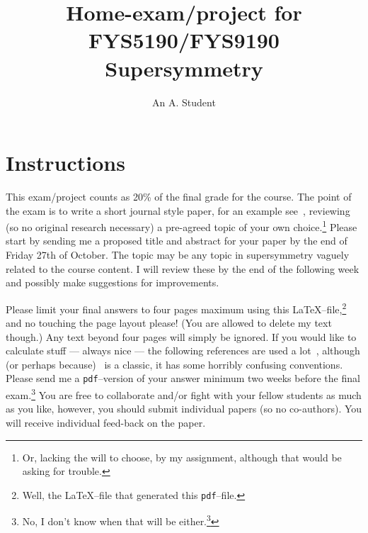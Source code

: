 \documentclass[twocolumn,a4paper,10pt]{article}
\author{An A. Student}
\title{Home-exam/project for FYS5190/FYS9190 Supersymmetry}
\begin{document}

\section{Instructions}
This exam/project counts as 20\% of the final grade for the course. The point of the exam is to write a short journal style paper, for an example see~\cite{Barr:2013sla}, reviewing (so no original research necessary) a pre-agreed topic of your own choice.\footnote{Or, lacking the will to choose, by my assignment, although that would be asking for trouble.} Please start by sending me a proposed title and abstract for your paper by the end of Friday 27th of October. The topic may be any topic in supersymmetry vaguely related to the course content. I will review these by the end of the following week and possibly make suggestions for improvements.

Please limit your final answers to four pages maximum using this \LaTeX--file,\footnote{Well, the \LaTeX--file that generated this {\tt pdf}--file.} and no touching the page layout please! (You are allowed to delete my text though.) Any text beyond four pages will simply be ignored. If you would like to calculate stuff --- always nice --- the following references are used a lot~\cite{Haber:1984rc,Richardson:2000nt}, although (or perhaps because)~\cite{Haber:1984rc} is a classic, it has some horribly confusing conventions.
Please send me a {\tt pdf}--version of your answer minimum two weeks before the final exam.\footnote{No, I don't know when that will be either.\footnote{We will figure it out eventually. Also, this proves footnotes don't really work well within footnotes.}} You are free to collaborate and/or fight with your fellow students as much as you like, however, you should submit individual papers (so no co-authors). You will receive individual feed-back on the paper.  
\end{document}
